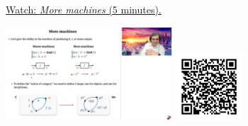 
\begin{minipage}{10cm}
    \href{https://act4e-spring21.netlify.app/videos/spring2021-actions:semi-actions:processes:more.html}{Watch: \emph{More machines} (5 minutes).}
        
    \href{https://act4e-spring21.netlify.app/videos/spring2021-actions:semi-actions:processes:more.html}{\includegraphics[height=3.5cm]{spring2021-actions:semi-actions:processes:more/thumbnails.jpg}}
    \href{https://act4e-spring21.netlify.app/videos/spring2021-actions:semi-actions:processes:more.html}{\includegraphics[height=2.5cm]{spring2021-actions:semi-actions:processes:more/qrcode.png}}
\end{minipage}
